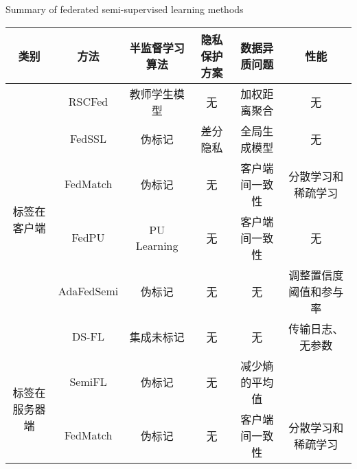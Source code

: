 
\begin{table}[h]

    \centering  %
    {\songti \wuhao Summary of federated semi-supervised learning methods}
    \label{SummaryOfFedSemi}
        {\songti \wuhao
            \begin{tabular}{cccccc}
                \toprule[1.5pt]
                类别 & 方法 & 半监督学习算法 & 隐私保护方案 & 数据异质问题 & 性能 \\
                \midrule
                \multirow{6}{}{标签在客户端} 
                & RSCFed     & 教师学生模型 & 无     & 加权距离聚合   & 无                \\
                & FedSSL     & 伪标记       & 差分隐私 & 全局生成模型     & 无               \\
                & FedMatch   & 伪标记       & 无     & 客户端间一致性  & 分散学习和稀疏学习 \\
                & FedPU      & PU Learning  & 无     & 客户端间一致性  & 无                \\
                & AdaFedSemi & 伪标记       & 无     & 无             & 调整置信度阈值和参与率 \\
                & DS-FL      & 集成未标记   & 无     & 无             & 传输日志、无参数     \\
                \midrule
                \multirow{2}{}{标签在服务器端} 
                & SemiFL     & 伪标记       & 无     & 减少熵的平均值   &                   \\
                & FedMatch   & 伪标记       & 无     & 客户端间一致性   & 分散学习和稀疏学习   \\
                \bottomrule[1.5pt]
            \end{tabular}
        }
\end{table}















